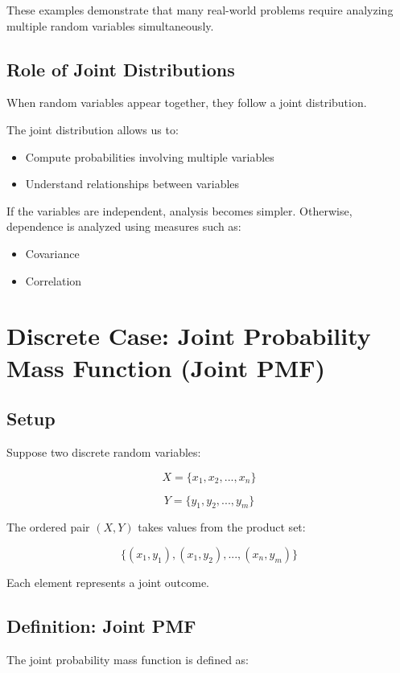 \documentclass[12pt]{article}
\begin{document}
These examples demonstrate that many real-world problems require analyzing multiple random variables simultaneously.

\subsection*{Role of Joint Distributions}

When random variables appear together, they follow a joint distribution.

The joint distribution allows us to:

\begin{itemize}
\item Compute probabilities involving multiple variables
\item Understand relationships between variables
\end{itemize}

If the variables are independent, analysis becomes simpler. Otherwise, dependence is analyzed using measures such as:

\begin{itemize}
\item Covariance
\item Correlation
\end{itemize}

\section{Discrete Case: Joint Probability Mass Function (Joint PMF)}

\subsection*{Setup}

Suppose two discrete random variables:

\[
X = \{x_1, x_2, ..., x_n\}
\]

\[
Y = \{y_1, y_2, ..., y_m\}
\]

The ordered pair $(X,Y)$ takes values from the product set:

\[
\{(x_1,y_1),(x_1,y_2),...,(x_n,y_m)\}
\]

Each element represents a joint outcome.

\subsection*{Definition: Joint PMF}

The joint probability mass function is defined as:
\end{document}
